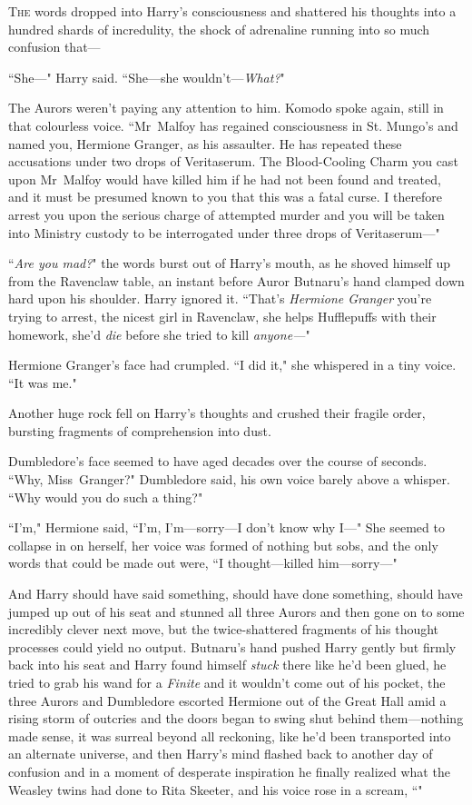 
\lettrine{T}{he} words dropped into Harry's consciousness and shattered his thoughts into a hundred shards of incredulity, the shock of adrenaline running into so much confusion that—

``She—" Harry said. ``She—she wouldn't—\emph{What?}"

The Aurors weren't paying any attention to him. Komodo spoke again, still in that colourless voice. ``Mr~Malfoy has regained consciousness in St. Mungo's and named you, Hermione Granger, as his assaulter. He has repeated these accusations under two drops of Veritaserum. The Blood-Cooling Charm you cast upon Mr~Malfoy would have killed him if he had not been found and treated, and it must be presumed known to you that this was a fatal curse. I therefore arrest you upon the serious charge of attempted murder and you will be taken into Ministry custody to be interrogated under three drops of Veritaserum—"

``\emph{Are you mad?}" the words burst out of Harry's mouth, as he shoved himself up from the Ravenclaw table, an instant before Auror Butnaru's hand clamped down hard upon his shoulder. Harry ignored it. ``That's \emph{Hermione Granger} you're trying to arrest, the nicest girl in Ravenclaw, she helps Hufflepuffs with their homework, she'd \emph{die} before she tried to kill \emph{anyone—}"

Hermione Granger's face had crumpled. ``I did it," she whispered in a tiny voice. ``It was me."

Another huge rock fell on Harry's thoughts and crushed their fragile order, bursting fragments of comprehension into dust.

Dumbledore's face seemed to have aged decades over the course of seconds. ``Why, Miss~Granger?" Dumbledore said, his own voice barely above a whisper. ``Why would you do such a thing?"

``I'm," Hermione said, ``I'm, I'm—sorry—I don't know why I—" She seemed to collapse in on herself, her voice was formed of nothing but sobs, and the only words that could be made out were, ``I thought—killed him—sorry—"

And Harry should have said something, should have done something, should have jumped up out of his seat and stunned all three Aurors and then gone on to some incredibly clever next move, but the twice-shattered fragments of his thought processes could yield no output. Butnaru's hand pushed Harry gently but firmly back into his seat and Harry found himself \emph{stuck} there like he'd been glued, he tried to grab his wand for a \emph{Finite} and it wouldn't come out of his pocket, the three Aurors and Dumbledore escorted Hermione out of the Great Hall amid a rising storm of outcries and the doors began to swing shut behind them—nothing made sense, it was surreal beyond all reckoning, like he'd been transported into an alternate universe, and then Harry's mind flashed back to another day of confusion and in a moment of desperate inspiration he finally realized what the Weasley twins had done to Rita Skeeter, and his voice rose in a scream, ``"

